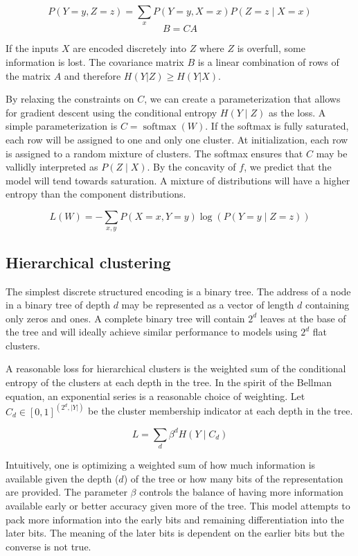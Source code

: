 \documentclass[11pt,letterpaper]{article}
\begin{document}
$$P(Y=y,Z=z) = \sum_x P(Y=y,X=x) P(Z=z \mid X=x)$$
$$B = C A $$ 

If the inputs $X$ are encoded discretely into $Z$ where $Z$ is overfull, some information is lost.  The covariance matrix $B$ is a linear combination of rows of the matrix $A$ and therefore $H(Y|Z) \ge H(Y|X)$. 

By relaxing the constraints on $C$, we can create a parameterization that allows for gradient descent using the conditional entropy $H(Y\mid Z)$ as the loss. A simple parameterization
is $C=\operatorname{softmax}(W)$. If the softmax is fully saturated, each row will be assigned to one and only one cluster. At initialization, each row is assigned to a random mixture of clusters. The softmax ensures that $C$ may be vallidly interpreted as $P(Z \mid X)$. By the concavity of $f$, we predict that the model will tend towards saturation. A mixture of distributions will have a higher entropy than the component distributions.

$$ L(W) = - \sum_{x,y} P(X=x, Y=y) \log( P(Y=y \mid Z=z)) $$

\subsection{Hierarchical clustering}

The simplest discrete structured encoding is a binary tree. The address of a node in a binary tree of depth $d$ may be represented as a vector of length $d$ containing only zeros and ones. A complete binary tree will contain $2^d$ leaves at the base of the tree and will ideally achieve similar performance to models using $2^d$ flat clusters.

A reasonable loss for hierarchical clusters is the weighted sum of the conditional entropy of the clusters at each depth in the tree. In the spirit of the Bellman equation, an exponential series is a reasonable choice of weighting. Let $C_d \in [0,1]^{(2^d, \lvert Y \rvert)}$ be the cluster membership indicator at each depth in the tree.

$$ L = \sum_d \beta ^ d  H(Y \mid C_d) $$

Intuitively, one is optimizing a weighted sum of how much information is available given the depth ($d$) of the tree or how many bits of the representation are provided. The parameter $\beta$ controls the balance of having more information available early or better accuracy given more of the tree. This model attempts to pack more information into the early bits and remaining differentiation into the later bits. The meaning of the later bits is dependent on the earlier bits but the converse is not true.
\end{document}
